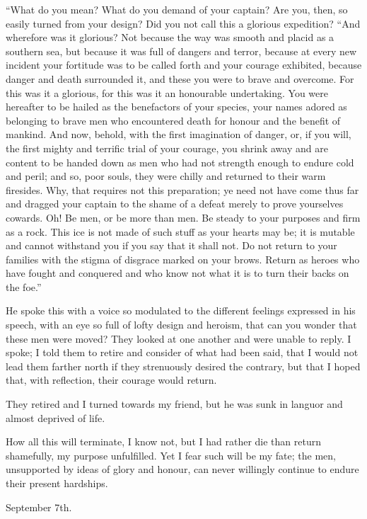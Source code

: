 \documentclass[12pt,openright]{book}
\begin{document}
“What do you mean? What do you demand of your captain? Are you, then, so easily turned from your design? Did you not call this a glorious expedition? “And wherefore was it glorious? Not because the way was smooth and placid as a southern sea, but because it was full of dangers and terror, because at every new incident your fortitude was to be called forth and your courage exhibited, because danger and death surrounded it, and these you were to brave and overcome. For this was it a glorious, for this was it an honourable undertaking. You were hereafter to be hailed as the benefactors of your species, your names adored as belonging to brave men who encountered death for honour and the benefit of mankind. And now, behold, with the first imagination of danger, or, if you will, the first mighty and terrific trial of your courage, you shrink away and are content to be handed down as men who had not strength enough to endure cold and peril; and so, poor souls, they were chilly and returned to their warm firesides. Why, that requires not this preparation; ye need not have come thus far and dragged your captain to the shame of a defeat merely to prove yourselves cowards. Oh! Be men, or be more than men. Be steady to your purposes and firm as a rock. This ice is not made of such stuff as your hearts may be; it is mutable and cannot withstand you if you say that it shall not. Do not return to your families with the stigma of disgrace marked on your brows. Return as heroes who have fought and conquered and who know not what it is to turn their backs on the foe.”

He spoke this with a voice so modulated to the different feelings expressed in his speech, with an eye so full of lofty design and heroism, that can you wonder that these men were moved? They looked at one another and were unable to reply. I spoke; I told them to retire and consider of what had been said, that I would not lead them farther north if they strenuously desired the contrary, but that I hoped that, with reflection, their courage would return.

They retired and I turned towards my friend, but he was sunk in languor and almost deprived of life.

How all this will terminate, I know not, but I had rather die than return shamefully, my purpose unfulfilled. Yet I fear such will be my fate; the men, unsupported by ideas of glory and honour, can never willingly continue to endure their present hardships.

September 7th.
\end{document}
